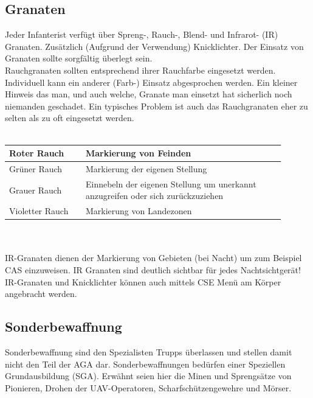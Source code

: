 \subsection{Granaten}
Jeder Infanterist verfügt über Spreng-, Rauch-, Blend- und Infrarot- (IR) Granaten. Zusätzlich (Aufgrund der Verwendung) Knicklichter. Der Einsatz von Granaten sollte sorgfältig überlegt sein. \\
Rauchgranaten sollten entsprechend ihrer Rauchfarbe eingesetzt werden. Individuell kann ein anderer (Farb-) Einsatz abgesprochen werden. Ein kleiner Hinweis das man, und auch welche, Granate man einsetzt hat sicherlich noch niemanden geschadet. Ein typisches Problem ist auch das Rauchgranaten eher zu selten als zu oft eingesetzt werden. \\
\\
\begin{tabular} {|p{0.25\linewidth}|p{0.65\linewidth}|} \hline
Roter Rauch		& Markierung von Feinden\\ \hline
Grüner Rauch	& Markierung der eigenen Stellung \\ \hline
Grauer Rauch	& Einnebeln der eigenen Stellung um unerkannt anzugreifen oder sich zurückzuziehen\\ \hline 
Violetter Rauch & Markierung von Landezonen \\ \hline
\end{tabular}\\
\\
IR-Granaten dienen der Markierung von Gebieten (bei Nacht) um zum Beispiel CAS einzuweisen. IR Granaten sind deutlich sichtbar für jedes Nachtsichtgerät! IR-Granaten und Knicklichter können auch mittels CSE Menü am Körper angebracht werden.

\subsection{Sonderbewaffnung}
Sonderbewaffnung sind den Spezialisten Trupps überlassen und stellen damit nicht den Teil der AGA dar. Sonderbewaffnungen bedürfen einer Speziellen Grundausbildung (SGA). Erwähnt seien hier die Minen und Sprengsätze von Pionieren, Drohen der UAV-Operatoren, Scharfschützengewehre und Mörser. \\


